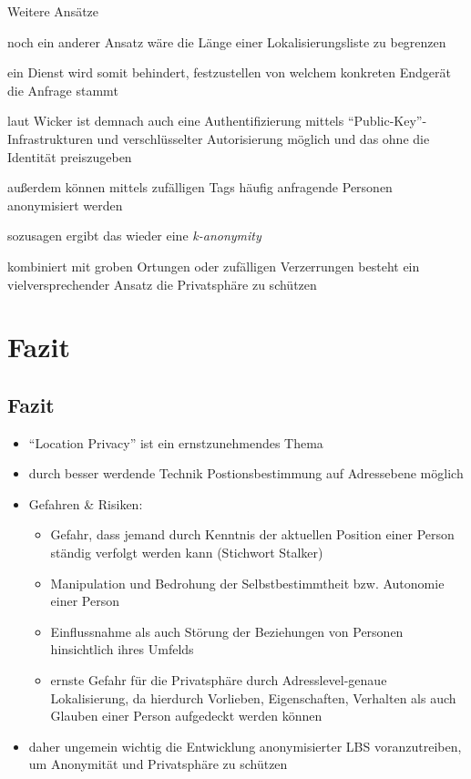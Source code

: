 \begin{frame}{Weitere Ansätze}
\itemize
\item noch ein anderer Ansatz wäre die Länge einer Lokalisierungsliste zu begrenzen
\item ein Dienst wird somit behindert, festzustellen von welchem konkreten Endgerät die Anfrage stammt
\item laut Wicker ist demnach auch eine Authentifizierung mittels "`Public-Key"'-Infrastrukturen und verschlüsselter Autorisierung möglich und das ohne die Identität preiszugeben
\item außerdem können mittels zufälligen Tags häufig anfragende Personen anonymisiert werden
\item sozusagen ergibt das wieder eine \textit{k-anonymity}
\item kombiniert mit groben Ortungen oder zufälligen Verzerrungen besteht ein vielversprechender Ansatz die Privatsphäre zu schützen
\enditemize
\end{frame}

\section{Fazit}
\subsection{Fazit}
\begin{frame}
\begin{itemize}
  \item "`Location Privacy"' ist ein ernstzunehmendes Thema
  \item durch besser werdende Technik Postionsbestimmung auf Adressebene möglich
  \item Gefahren \& Risiken:
  \begin{itemize}
  \item Gefahr, dass jemand durch Kenntnis der aktuellen Position einer Person ständig verfolgt werden kann (Stichwort Stalker)
  \item Manipulation und Bedrohung der Selbstbestimmtheit bzw. Autonomie einer Person
  \item Einflussnahme als auch Störung der Beziehungen von Personen hinsichtlich ihres Umfelds
  \item ernste Gefahr für die Privatsphäre durch Adresslevel-genaue Lokalisierung, da hierdurch Vorlieben, Eigenschaften, Verhalten als auch Glauben einer Person aufgedeckt werden können  
  \end{itemize}
  \item daher ungemein wichtig die Entwicklung anonymisierter LBS voranzutreiben, um Anonymität und Privatsphäre zu schützen
\end{itemize}
\end{frame} 

